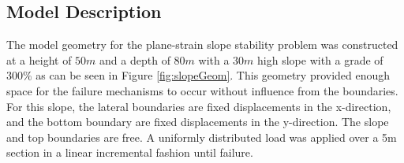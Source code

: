 \subsection{Model Description}

The model geometry for the plane-strain slope stability problem was constructed at a height of $50m$ and a depth of $80m$ with a $30m$ high slope with a grade of $300\%$ as can be seen in Figure \ref{fig:slopeGeom}. This geometry provided enough space for the failure mechanisms to occur without influence from the boundaries. For this slope, the lateral boundaries are fixed displacements in the x-direction, and the bottom boundary are fixed displacements in the y-direction. The slope and top boundaries are free. A uniformly distributed load was applied over a 5m section in a linear incremental fashion until failure.

